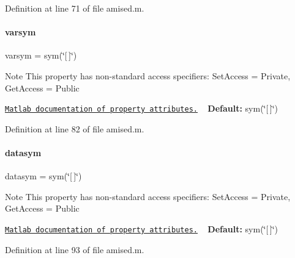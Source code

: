 Definition at line 71 of file amised.\+m.

\mbox{\label{classamised_ac797dd450a486506c269d236f884a292}} 
\paragraph{\texorpdfstring{varsym}{varsym}}
{\footnotesize\ttfamily varsym = sym(\char`\"{}\mbox{[}$\,$\mbox{]}\char`\"{})}

\begin{DoxyNote}{Note}
This property has non-\/standard access specifiers\+: {\ttfamily Set\+Access = Private, Get\+Access = Public} 

\href{http://www.mathworks.com/help/matlab/matlab_oop/property-attributes.html}{\tt Matlab documentation of property attributes.} ~\newline
{\bfseries Default\+:} sym(\char`\"{}\mbox{[}$\,$\mbox{]}\char`\"{}) 
\end{DoxyNote}


Definition at line 82 of file amised.\+m.

\mbox{\label{classamised_a38785e52a777bfe687f5418a2dcb44b7}} 
\paragraph{\texorpdfstring{datasym}{datasym}}
{\footnotesize\ttfamily datasym = sym(\char`\"{}\mbox{[}$\,$\mbox{]}\char`\"{})}

\begin{DoxyNote}{Note}
This property has non-\/standard access specifiers\+: {\ttfamily Set\+Access = Private, Get\+Access = Public} 

\href{http://www.mathworks.com/help/matlab/matlab_oop/property-attributes.html}{\tt Matlab documentation of property attributes.} ~\newline
{\bfseries Default\+:} sym(\char`\"{}\mbox{[}$\,$\mbox{]}\char`\"{}) 
\end{DoxyNote}


Definition at line 93 of file amised.\+m.

